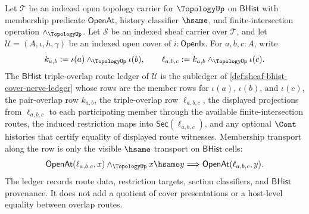 \begin{definition}
\label{def:sheaf-bhist-triple-overlap-route-ledger}
Let $\mathcal{T}$ be an indexed open topology carrier for $\TopologyUp$ on $\mathsf{BHist}$ with membership predicate $\mathsf{OpenAt}$, history classifier $\hsame$, and finite-intersection operation $\wedge_{\TopologyUp}$. Let $\mathcal{S}$ be an indexed sheaf carrier over $\mathcal{T}$, and let $\mathcal{U}=(A,\iota,h,\gamma)$ be an indexed open cover of $i:\mathsf{OpenIx}$. For $a,b,c:A$, write
$$
k_{a,b}:=\iota(a)\wedge_{\TopologyUp}\iota(b),
\qquad
\ell_{a,b,c}:=k_{a,b}\wedge_{\TopologyUp}\iota(c).
$$
The $\mathsf{BHist}$ triple-overlap route ledger of $\mathcal{U}$ is the subledger of \autoref{def:sheaf-bhist-cover-nerve-ledger} whose rows are the member rows for $\iota(a)$, $\iota(b)$, and $\iota(c)$, the pair-overlap row $k_{a,b}$, the triple-overlap row $\ell_{a,b,c}$, the displayed projections from $\ell_{a,b,c}$ to each participating member through the available finite-intersection routes, the induced restriction maps into $\mathsf{Sec}(\ell_{a,b,c})$, and any optional $\Cont$ histories that certify equality of displayed route witnesses. Membership transport along the row is only the visible $\hsame$ transport on $\mathsf{BHist}$ cells:
$$
\mathsf{OpenAt}(\ell_{a,b,c},x)\wedge_{\TopologyUp} x\hsame y
\Longrightarrow
\mathsf{OpenAt}(\ell_{a,b,c},y).
$$
The ledger records route data, restriction targets, section classifiers, and $\mathsf{BHist}$ provenance. It does not add a quotient of cover presentations or a host-level equality between overlap routes.
\end{definition}

